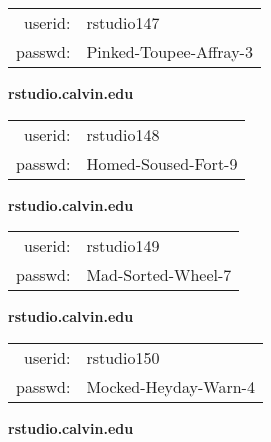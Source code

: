 \documentclass{article}\usepackage[]{graphicx}\usepackage[]{color}
\begin{document}
\begin{multicols}{3}
\begin{minipage}{.3\textwidth}
\begin{tabular}{rl}
userid: & rstudio147\\
passwd: & Pinked-Toupee-Affray-3

\vspace{5mm}

\end{tabular}\end{minipage}

\vspace{5mm}

\begin{minipage}{.3\textwidth}
\centerline{\textbf{rstudio.calvin.edu}}
\medskip
\begin{tabular}{rl}

userid: & rstudio148\\
passwd: & Homed-Soused-Fort-9

\vspace{5mm}

\end{tabular}\end{minipage}

\vspace{5mm}

\begin{minipage}{.3\textwidth}
\centerline{\textbf{rstudio.calvin.edu}}
\medskip
\begin{tabular}{rl}

userid: & rstudio149\\
passwd: & Mad-Sorted-Wheel-7

\vspace{5mm}

\end{tabular}\end{minipage}

\vspace{5mm}

\begin{minipage}{.3\textwidth}
\centerline{\textbf{rstudio.calvin.edu}}
\medskip
\begin{tabular}{rl}

userid: & rstudio150\\
passwd: & Mocked-Heyday-Warn-4

\vspace{5mm}

\end{tabular}\end{minipage}

\vspace{5mm}

\begin{minipage}{.3\textwidth}
\centerline{\textbf{rstudio.calvin.edu}}
\medskip
\begin{tabular}{rl}


\end{tabular}
\end{minipage}
\end{multicols}
\end{document}
